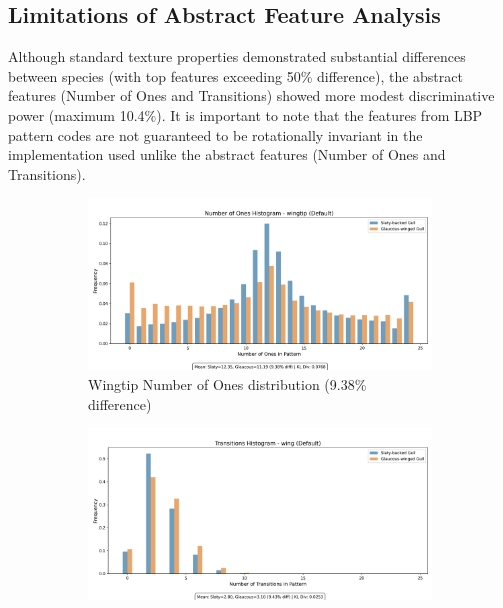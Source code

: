 \documentclass[a4paper,12pt]{report}
\begin{document}
\subsection{Limitations of Abstract Feature Analysis}
\label{subsec:feature_limitations}

Although standard texture properties demonstrated substantial differences between species (with top features exceeding 50\% difference), the abstract features (Number of Ones and Transitions) showed more modest discriminative power (maximum 10.4\%). It is important to note that the features from LBP pattern codes are not guaranteed to be rotationally invariant in the implementation used unlike the abstract features (Number of Ones and Transitions).

\begin{figure}[htbp]
    \centering
    \begin{subfigure}[b]{0.49\textwidth}
        \includegraphics[width=\textwidth]{images/LBP/default_wingtip_ones_histogram.png}
        \caption{Wingtip Number of Ones distribution (9.38\% difference)}
        \label{fig:wingtip_ones}
    \end{subfigure}
    \hfill
    \begin{subfigure}[b]{0.49\textwidth}
        \includegraphics[width=\textwidth]{images/LBP/default_wing_transitions_histogram.png}

\end{subfigure}
\end{figure}
\end{document}
